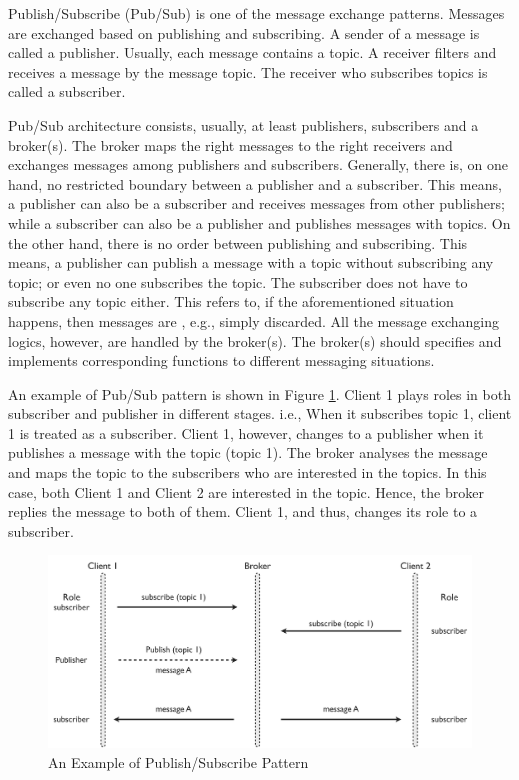 Publish/Subscribe (Pub/Sub) is one of the message exchange patterns. Messages are exchanged based on publishing and subscribing. A sender of a message is called a publisher. Usually, each message contains a topic. A receiver filters and receives a message by the message topic. The receiver who subscribes topics is called a subscriber. 

Pub/Sub architecture consists, usually, at least publishers, subscribers and a broker(s). The broker maps the right messages to the right receivers and exchanges messages among publishers and subscribers. Generally, there is, on one hand, no restricted boundary between a publisher and a subscriber. This means, a publisher can also be a subscriber and receives messages from other publishers; while a subscriber can also be a publisher and publishes messages with topics. On the other hand, there is no order between publishing and subscribing. This means, a publisher can publish a message with a topic without subscribing any topic; or even no one subscribes the topic. The subscriber does not have to subscribe any topic either. This refers to, if the aforementioned situation happens, then messages are , e.g., simply discarded. All the message exchanging logics, however, are handled by the broker(s). The broker(s) should specifies and implements corresponding functions to different messaging situations. 

An example of Pub/Sub pattern is shown in Figure \ref{fig:publish-subscribe-pattern}. Client 1 plays roles in both subscriber and publisher in different stages. i.e., When it subscribes topic 1, client 1 is treated as a subscriber. Client 1, however, changes to a publisher when it publishes a message with the topic (topic 1). The broker analyses the message and maps the topic to the subscribers who are interested in the topics. In this case, both Client 1 and Client 2 are interested in the topic. Hence, the broker replies the message to both of them. Client 1, and thus, changes its role to a subscriber.

\begin{figure}[t]
  \begin{center}
    \includegraphics[width=1\textwidth]{images/publish-subscribe-pattern.pdf}
    \caption{An Example of Publish/Subscribe Pattern}
    \label{fig:publish-subscribe-pattern}
  \end{center}
\end{figure}

